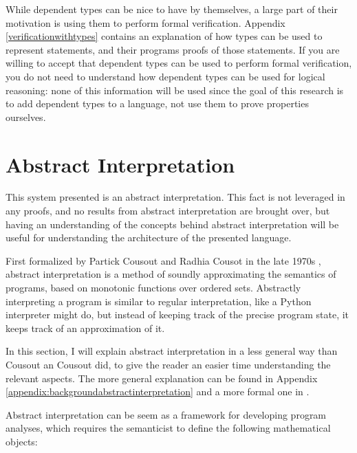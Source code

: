 \documentclass[12pt,twoside]{report}
\begin{document}
While dependent types can be nice to have by themselves, a large part of their motivation is using them to perform formal verification. Appendix \ref{verificationwithtypes} contains an explanation of how types can be used to represent statements, and their programs proofs of those statements. If you are willing to accept that dependent types can be used to perform formal verification, you do not need to understand how dependent types can be used for logical reasoning: none of this information will be used since the goal of this research is to add dependent types to a language, not use them to prove properties ourselves.

\section{Abstract Interpretation}
This system presented is an abstract interpretation. This fact is not leveraged in any proofs, and no results from abstract interpretation are brought over, but having an understanding of the concepts behind abstract interpretation will be useful for understanding the architecture of the presented language.

First formalized by Partick Cousout and Radhia Cousot in the late 1970s \citep{cousotAbstractInterpretationUnified1977}, abstract interpretation is a method of soundly approximating the semantics of programs, based on monotonic functions over ordered sets. Abstractly interpreting a program is similar to regular interpretation, like a Python interpreter might do, but instead of keeping track of the precise program state, it keeps track of an approximation of it.

In this section, I will explain abstract interpretation in a less general way than Cousout an Cousout did, to give the reader an easier time understanding the relevant aspects. The more general explanation can be found in Appendix \ref{appendix:backgroundabstractinterpretation} and a more formal one in \cite{blanchetIntroductionAbstractInterpretation}.

Abstract interpretation can be seem as a framework for developing program analyses, which requires the semanticist to define the following mathematical objects:
\end{document}
